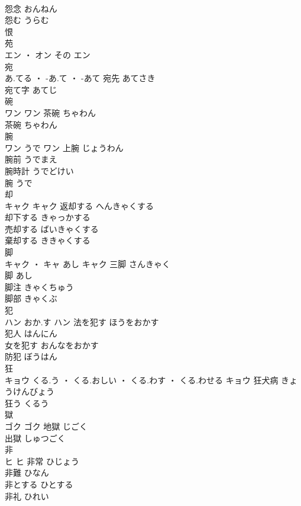 \documentclass[8pt]{extreport}
\begin{document}
\begin{CJK}{UTF8}{min}
\\	怨念	おんねん	
\\	怨む	うらむ	
\\	恨 
\\	苑	
\\	エン ・ オン	その	エン																																			
\\	宛	
\\	あ.てる ・ -あ.て ・ -あて		宛先	あてさき	
\\	宛て字	あてじ	
\\	碗	
\\	ワン		ワン	茶碗	ちゃわん	
\\	茶碗	ちゃわん	
\\	腕	
\\	ワン	うで	ワン	上腕	じょうわん	
\\	腕前	うでまえ	
\\	腕時計	うでどけい	
\\	腕	うで	
\\	却	
\\	キャク		キャク	返却する	へんきゃくする	
\\	却下する	きゃっかする	
\\	売却する	ばいきゃくする	
\\	棄却する	ききゃくする	
\\	脚	
\\	キャク ・ キャ	あし	キャク	三脚	さんきゃく	
\\	脚	あし	
\\	脚注	きゃくちゅう	
\\	脚部	きゃくぶ	
\\	犯	
\\	ハン	おか.す	ハン	法を犯す	ほうをおかす	
\\	犯人	はんにん	
\\	女を犯す	おんなをおかす	
\\	防犯	ぼうはん	
\\	狂	
\\	キョウ	くる.う ・ くる.おしい ・ くる.わす ・ くる.わせる	キョウ	狂犬病	きょうけんびょう	
\\	狂う	くるう	
\\	獄	
\\	ゴク		ゴク	地獄	じごく	
\\	出獄	しゅつごく	
\\	非	
\\	ヒ		ヒ	非常	ひじょう	
\\	非難	ひなん	
\\	非とする	ひとする	
\\	非礼	ひれい	

\end{CJK}
\end{document}
